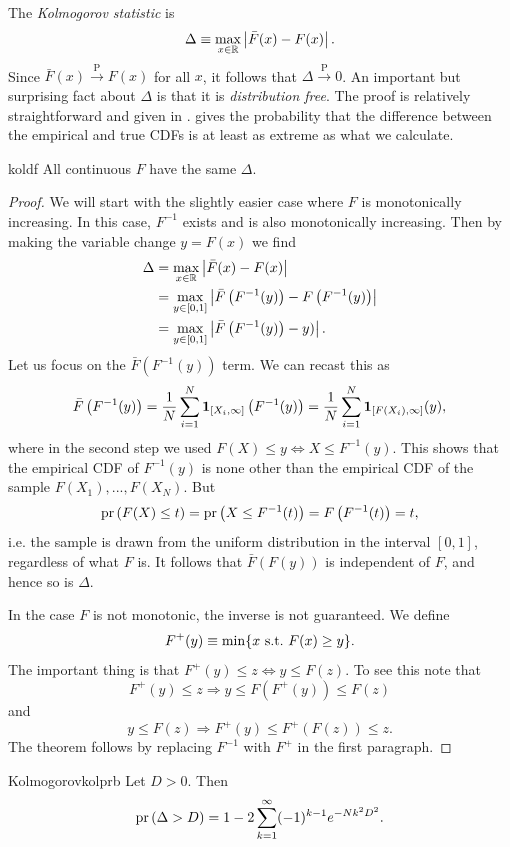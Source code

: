 The {\it Kolmogorov statistic} is
\begin{equation}
  \Delta\equiv\max_{x\in\mathbb{R}}\left|\bar{F}(x)-F(x)\right|.
\end{equation}
Since $\bar{F}(x)\xrightarrow{\text{P}}F(x)$ for all $x$, it follows
that $\Delta\xrightarrow{\text{P}}0$. An important but surprising
fact about $\Delta$ is that it is {\it distribution free}.
The proof is relatively straightforward and given in
.  gives
the probability that the difference between the empirical and true
CDFs is at least as extreme as what we calculate.
\begin{theorem}{}{koldf}
  All continuous $F$ have the same $\Delta$. 
  \begin{proof}
    We will start with the slightly easier case where $F$ is monotonically
    increasing. In this case, $F^{-1}$ exists and is also monotonically
    increasing. Then by making the variable change $y=F(x)$ we find
    \begin{equation*}
      \begin{aligned}
      \Delta&=\max_{x\in\mathbb{R}}\left|\bar{F}(x)-F(x)\right|\\
            &=\max_{y\in[0,1]}\left|
                \bar{F}\left(F^{-1}(y)\right)-F\left(F^{-1}(y)\right)\right|\\
            &=\max_{y\in[0,1]}\left|
                \bar{F}\left(F^{-1}(y)\right)-y)\right|.
      \end{aligned}
    \end{equation*}
    Let us focus on the $\bar{F}(F^{-1}(y))$ term. We can recast this as
    $$
      \bar{F}\left(F^{-1}(y)\right)
          =\frac{1}{N}\sum_{i=1}^N{\mathbf 1}_{[X_i,\infty]}\left(F^{-1}(y)\right)
          =\frac{1}{N}\sum_{i=1}^N{\mathbf 1}_{[F(X_i),\infty]}(y),
    $$
    where in the second step we used 
    $F(X)\leq y\Leftrightarrow X\leq F^{-1}(y)$. This shows that the
    empirical CDF of $F^{-1}(y)$ is none other than the empirical CDF 
    of the sample $F(X_1),...,F(X_N)$. But
    $$
      \operatorname{pr}\left(F(X)\leq t\right)=\operatorname{pr}\left(X\leq F^{-1}(t)\right)=F\left(F^{-1}(t)\right)=t,
    $$
    i.e. the sample is drawn from the uniform distribution in the
    interval $[0,1]$, regardless of what $F$ is. It follows that 
    $\bar{F}\left(F(y)\right)$ is independent of $F$, and hence so 
    is $\Delta$.

    In the case $F$ is not monotonic, the inverse is not guaranteed.
    We define
    $$
      F^+(y)\equiv\min\{x~\text{s.t.}~ F(x)\geq y\}.
    $$
    The important thing is that $F^+(y)\leq z\Leftrightarrow y\leq F(z)$.
    To see this note that
    $$
      F^+(y)\leq z \Rightarrow y\leq F\left(F^+(y)\right)\leq F(z)
    $$
    and
    $$
      y\leq F(z)\Rightarrow F^+(y)\leq F^+\left(F(z)\right)\leq z.
    $$
    The theorem follows by replacing $F^{-1}$ with $F^+$ 
    in the first paragraph.
  \end{proof}
\end{theorem}
\begin{theorem}{Kolmogorov}{kolprb}
  Let $D>0$. Then
  $$
    \operatorname{pr}\left(\Delta>D\right)=1-2\sum_{k=1}^\infty(-1)^{k-1}e^{-Nk^2D^2}.
  $$
\end{theorem}

